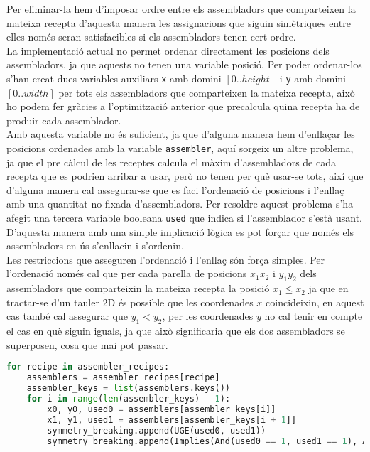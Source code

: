 Per eliminar-la hem d'imposar ordre entre els assembladors que comparteixen la mateixa recepta d'aquesta manera les assignacions que siguin simètriques entre elles només seran satisfacibles si els assembladors tenen cert ordre.\\
La implementació actual no permet ordenar directament les posicions dels assembladors, ja que aquests no tenen una variable posició. Per poder ordenar-los s'han creat dues variables auxiliars \texttt{x} amb domini $[0..height]$ i \texttt{y} amb domini $[0..width]$ per tots els assembladors que comparteixen la mateixa recepta, això ho podem fer gràcies a l'optimització anterior que precalcula quina recepta ha de produir cada assemblador.\\
Amb aquesta variable no és suficient, ja que d'alguna manera hem d'enllaçar les posicions ordenades amb la variable \texttt{assembler}, aquí sorgeix un altre problema, ja que el pre càlcul de les receptes calcula el màxim d'assembladors de cada recepta que es podrien arribar a usar, però no tenen per què usar-se tots, així que d'alguna manera cal assegurar-se que es faci l'ordenació de posicions i l'enllaç amb una quantitat no fixada d'assembladors. Per resoldre aquest problema s'ha afegit una tercera variable booleana \texttt{used} que indica si l'assemblador s'està usant. D'aquesta manera amb una simple implicació lògica es pot forçar que només els assembladors en ús s'enllacin i s'ordenin.\\

Les restriccions que asseguren l'ordenació i l'enllaç són força simples. Per l'ordenació només cal que per cada parella de posicions $x_1 x_2$ i $y_1 y_2$ dels assembladors que comparteixin la mateixa recepta la posició $x_1 \leq x_2$ ja que en tractar-se d'un tauler 2D és possible que les coordenades $x$ coincideixin, en aquest cas també cal assegurar que $y_1 < y_2$, per les coordenades $y$ no cal tenir en compte el cas en què siguin iguals, ja que això significaria que els dos assembladors se superposen, cosa que mai pot passar.

\begin{lstlisting}[language=Python, caption=Posicions ordenades]
for recipe in assembler_recipes:
    assemblers = assembler_recipes[recipe]
    assembler_keys = list(assemblers.keys())
    for i in range(len(assembler_keys) - 1):
        x0, y0, used0 = assemblers[assembler_keys[i]]
        x1, y1, used1 = assemblers[assembler_keys[i + 1]]
        symmetry_breaking.append(UGE(used0, used1))
        symmetry_breaking.append(Implies(And(used0 == 1, used1 == 1), And(ULE(x0, x1), Implies(x0 == x1, ULT(y0, y1)))))
\end{lstlisting}

